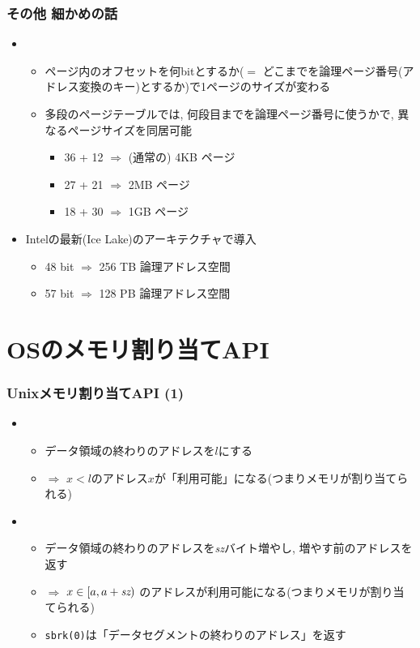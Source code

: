 \documentclass[12pt,dvipdfmx]{beamer}
\begin{document}
\begin{frame}
  \frametitle{その他 細かめの話}
  \begin{itemize}
  \item {}
    \begin{itemize}
    \item ページ内のオフセットを何bitとするか($=$ どこまでを論理ページ番号(アドレス変換のキー)とするか)で1ページのサイズが変わる
    \item 多段のページテーブルでは, 何段目までを論理ページ番号に使うかで,
      異なるページサイズを同居可能
      \begin{itemize}
      \item 36 + 12 $\Rightarrow$ (通常の) 4KB ページ
      \item 27 + 21 $\Rightarrow$ 2MB ページ
      \item 18 + 30 $\Rightarrow$ 1GB ページ
      \end{itemize}
    \end{itemize}
  \item {}
    Intelの最新(Ice Lake)のアーキテクチャで導入
    \begin{itemize}
    \item 48 bit $\Rightarrow$ 256 TB 論理アドレス空間
    \item 57 bit $\Rightarrow$ 128 PB 論理アドレス空間
    \end{itemize}
  \end{itemize}
\end{frame}

\section{OSのメモリ割り当てAPI}

\begin{frame}
  \frametitle{Unixメモリ割り当てAPI (1)}
  \begin{itemize}
  \item {}
    \begin{itemize}
    \item データ領域の終わりのアドレスを$l$にする
    \item $\Rightarrow$ $x < l$のアドレス$x$が「利用可能」になる(つまりメモリが割り当てられる)
    \end{itemize}
  \item {}
    \begin{itemize}
    \item データ領域の終わりのアドレスを{\it sz}バイト増やし,
      増やす前のアドレスを返す
    \item $\Rightarrow$ $x \in [a, a+\mbox{\it sz})$
      のアドレスが利用可能になる(つまりメモリが割り当てられる)
    \item {\tt sbrk(0)}は「データセグメントの終わりのアドレス」を返す
    \end{itemize}
  \end{itemize}
\end{frame}
\end{document}
